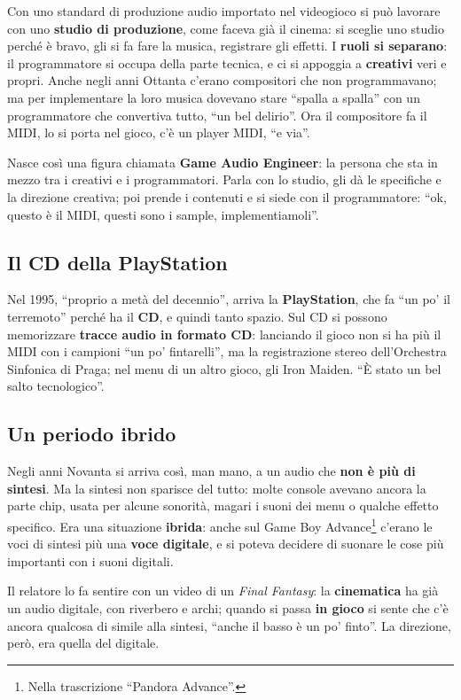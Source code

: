 Con uno standard di produzione audio importato nel videogioco si può lavorare
con uno \textbf{studio di produzione}, come faceva già il cinema: si sceglie uno
studio perché è bravo, gli si fa fare la musica, registrare gli effetti. I
\textbf{ruoli si separano}: il programmatore si occupa della parte tecnica, e ci
si appoggia a \textbf{creativi} veri e propri. Anche negli anni Ottanta c'erano
compositori che non programmavano; ma per implementare la loro musica dovevano
stare ``spalla a spalla'' con un programmatore che convertiva tutto, ``un bel
delirio''. Ora il compositore fa il MIDI, lo si porta nel gioco, c'è un player
MIDI, ``e via''.

Nasce così una figura chiamata \textbf{Game Audio Engineer}: la persona che sta
in mezzo tra i creativi e i programmatori. Parla con lo studio, gli dà le
specifiche e la direzione creativa; poi prende i contenuti e si siede con il
programmatore: ``ok, questo è il MIDI, questi sono i sample, implementiamoli''.

\subsection{Il CD della PlayStation}

Nel 1995, ``proprio a metà del decennio'', arriva la \textbf{PlayStation}, che fa
``un po' il terremoto'' perché ha il \textbf{CD}, e quindi tanto spazio. Sul CD si
possono memorizzare \textbf{tracce audio in formato CD}: lanciando il gioco non
si ha più il MIDI con i campioni ``un po' fintarelli'', ma la registrazione
stereo dell'Orchestra Sinfonica di Praga; nel menu di un altro gioco, gli Iron
Maiden. ``È stato un bel salto tecnologico''.

\subsection{Un periodo ibrido}

Negli anni Novanta si arriva così, man mano, a un audio che \textbf{non è più di
sintesi}. Ma la sintesi non sparisce del tutto: molte console avevano ancora la
parte chip, usata per alcune sonorità, magari i suoni dei menu o qualche effetto
specifico. Era una situazione \textbf{ibrida}: anche sul Game Boy
Advance\footnote{Nella trascrizione ``Pandora Advance''.} c'erano le voci di
sintesi più una \textbf{voce digitale}, e si poteva decidere di suonare le cose
più importanti con i suoni digitali.

Il relatore lo fa sentire con un video di un \emph{Final Fantasy}: la
\textbf{cinematica} ha già un audio digitale, con riverbero e archi; quando si
passa \textbf{in gioco} si sente che c'è ancora qualcosa di simile alla sintesi,
``anche il basso è un po' finto''. La direzione, però, era quella del digitale.

